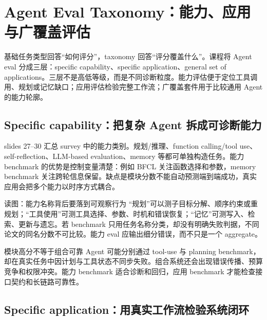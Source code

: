 \section{Agent Eval Taxonomy：能力、应用与广覆盖评估}

基础任务类型回答“如何评分”，taxonomy 回答“评分覆盖什么”。课程将 Agent eval 分成三层：specific capability、specific application、general set of applications。三层不是高低等级，而是不同诊断粒度。能力评估便于定位工具调用、规划或记忆缺口；应用评估检验完整工作流；广覆盖套件用于比较通用 Agent 的能力轮廓。

\subsection{Specific capability：把复杂 Agent 拆成可诊断能力}

slides 27--30 汇总 survey 中的能力类别。规划/推理、function calling/tool use、self-reflection、LLM-based evaluation、memory 等都可单独构造任务。能力 benchmark 的优势是控制变量清楚：例如 BFCL 关注函数选择和参数，memory benchmark 关注跨轮信息保留。缺点是模块分数不能自动预测端到端成功，真实应用会把多个能力以时序方式耦合。


\begin{knowledgebox}{读图：能力名称背后要落到可观察行为}
“规划”可以测子目标分解、顺序约束或重规划；“工具使用”可测工具选择、参数、时机和错误恢复；“记忆”可测写入、检索、更新与遗忘。若 benchmark 只用任务名称分类，却没有明确失败判据，不同论文的同名分数不可比较。能力 eval 应输出细分错误，而不只是一个 aggregate。
\end{knowledgebox}

\begin{warningbox}{模块高分不等于组合可靠}
Agent 可能分别通过 tool-use 与 planning benchmark，却在真实任务中因计划与工具状态不同步失败。组合系统还会出现错误传播、预算竞争和权限冲突。能力 benchmark 适合诊断和回归，应用 benchmark 才能检查接口契约和长链路可靠性。
\end{warningbox}

\subsection{Specific application：用真实工作流检验系统闭环}

